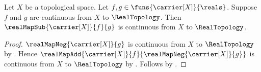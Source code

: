 \begin{theorem}\label{real_map_sub_continuous}
    Let $X$ be a topological space.
    Let $f,g\in\funs{\carrier[X]}{\reals}$.
    Suppose $f$ and $g$ are continuous from $X$ to $\RealTopology$.
    Then $\realMapSub{\carrier[X]}{f}{g}$ is continuous from $X$ to
        $\RealTopology$.
\end{theorem}
\begin{proof}
    $\realMapNeg{\carrier[X]}{g}$ is continuous from $X$ to
        $\RealTopology$ by .
    Hence
        $\realMapAdd{\carrier[X]}{f}{\realMapNeg{\carrier[X]}{g}}$
            is continuous from $X$ to $\RealTopology$
        by .
    Follows by .
\end{proof}

